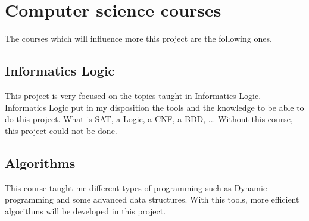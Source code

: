 
\chapter{Computer science courses} %

\label{Chapter3} %

The courses which will influence more this project are the following ones.\\

\section{Informatics Logic}

This project is very focused on the topics taught in Informatics Logic.  
Informatics Logic put in my disposition the tools and the knowledge to be able to do this project. What is SAT, a Logic, a CNF, a BDD, ...
Without this course, this project could not be done.

\section{Algorithms}

This course taught me different types of programming such as Dynamic programming and some advanced data structures. With this tools, more efficient algorithms will be developed in this project. 
